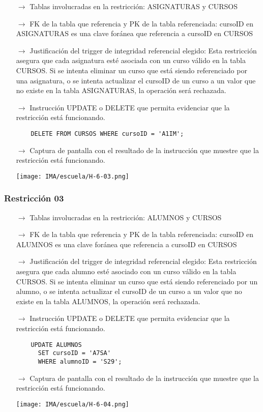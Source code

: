 \begin{itemize}
  \item[$\rightarrow$] Tablas involucradas en la restricción: ASIGNATURAS y CURSOS
  \item[$\rightarrow$] FK de la tabla que referencia y PK de la tabla referenciada: cursoID en ASIGNATURAS es una clave foránea que referencia a cursoID en CURSOS
  \item[$\rightarrow$] Justificación del trigger de integridad referencial elegido: Esta restricción asegura que cada asignatura esté asociada con un curso válido en la tabla CURSOS. Si se intenta eliminar un curso que está siendo referenciado por una asignatura, o se intenta actualizar el cursoID de un curso a un valor que no existe en la tabla ASIGNATURAS, la operación será rechazada.
  \item[$\rightarrow$] Instrucción UPDATE o DELETE que permita evidenciar que la restricción está funcionando.
  \begin{verbatim}
    DELETE FROM CURSOS WHERE cursoID = 'A1IM';
  \end{verbatim}
  \item[$\rightarrow$] Captura de pantalla con el resultado de la instrucción que muestre que la restricción está funcionando.
  \begin{center}
    \texttt{[image: IMA/escuela/H-6-03.png]}
  \end{center}
\end{itemize}


\subsubsection*{Restricción 03}

\begin{itemize}
  \item[$\rightarrow$] Tablas involucradas en la restricción: ALUMNOS y CURSOS
  \item[$\rightarrow$] FK de la tabla que referencia y PK de la tabla referenciada: cursoID en ALUMNOS es una clave foránea que referencia a cursoID en CURSOS
  \item[$\rightarrow$] Justificación del trigger de integridad referencial elegido: Esta restricción asegura que cada alumno esté asociado con un curso válido en la tabla CURSOS. Si se intenta eliminar un curso que está siendo referenciado por un alumno, o se intenta actualizar el cursoID de un curso a un valor que no existe en la tabla ALUMNOS, la operación será rechazada.
  \item[$\rightarrow$] Instrucción UPDATE o DELETE que permita evidenciar que la restricción está funcionando.
  \begin{verbatim}
    UPDATE ALUMNOS
      SET cursoID = 'A7SA'
      WHERE alumnoID = 'S29';
  \end{verbatim}
  \item[$\rightarrow$] Captura de pantalla con el resultado de la instrucción que muestre que la restricción está funcionando.
  \begin{center}
    \texttt{[image: IMA/escuela/H-6-04.png]}
  \end{center}
\end{itemize}


